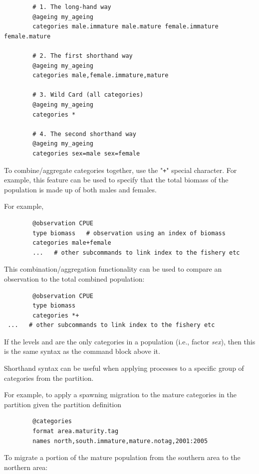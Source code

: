 {\small{\begin{verbatim}
		# 1. The long-hand way
		@ageing my_ageing
		categories male.immature male.mature female.immature female.mature

		# 2. The first shorthand way
		@ageing my_ageing
		categories male,female.immature,mature

		# 3. Wild Card (all categories)
		@ageing my_ageing
		categories *

		# 4. The second shorthand way
		@ageing my_ageing
		categories sex=male sex=female
\end{verbatim}}}

To combine/aggregate categories together, use the "\texttt{+}" special character. For example, this feature can be used to specify that the total biomass of the population is made up of both males and females.

For example,

{\small{\begin{verbatim}
		@observation CPUE
		type biomass   # observation using an index of biomass
		categories male+female
        ...   # other subcommands to link index to the fishery etc
\end{verbatim}}}

This combination/aggregation functionality can be used to compare an observation to the total combined population:

{\small{\begin{verbatim}
		@observation CPUE
		type biomass
		categories *+
 ...   # other subcommands to link index to the fishery etc
		\end{verbatim}}}

If the levels  and  are the only categories in a population (i.e., factor \textit{sex}), then this is the same syntax as the command block above it.

Shorthand syntax can be useful when applying processes to a specific group of categories from the partition.

For example, to apply a spawning migration to the mature categories in the partition given the partition definition

{\small{\begin{verbatim}
		@categories
		format area.maturity.tag
		names north,south.immature,mature.notag,2001:2005
\end{verbatim}}}

To migrate a portion of the mature population from the southern area to the northern area:

